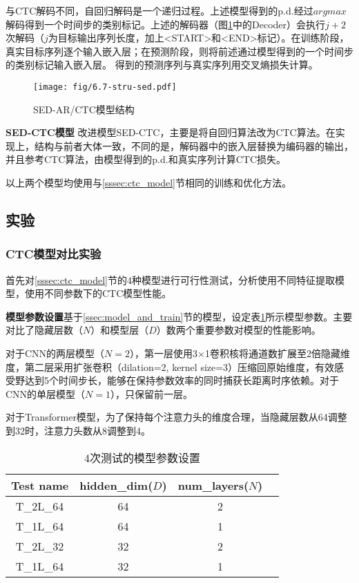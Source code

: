 与CTC解码不同，自回归解码是一个递归过程。上述模型得到的p.d.经过$argmax$解码得到一个时间步的类别标记。上述的解码器（图\ref{fig:6.7-stru-sed}中的Decoder）会执行$j+2$次解码（$j$为目标输出序列长度，加上<START>和<END>标记）。在训练阶段，真实目标序列逐个输入嵌入层；在预测阶段，则将前述通过模型得到的一个时间步的类别标记输入嵌入层。
得到的预测序列与真实序列用交叉熵损失计算。

\begin{figure}
    \centering
    \texttt{[image: fig/6.7-stru-sed.pdf]}
    \caption{SED-AR/CTC模型结构}
    \label{fig:6.7-stru-sed}
\end{figure}

\textbf{SED-CTC模型}\hspace{5pt} 改进模型SED-CTC，主要是将自回归算法改为CTC算法。在实现上，结构与前者大体一致，不同的是，解码器中的嵌入层替换为编码器的输出，并且参考CTC算法\cite{graves2006connectionist}，由模型得到的p.d.和真实序列计算CTC损失。

以上两个模型均使用与\ref{sssec:ctc_model}节相同的训练和优化方法。

\subsection{实验}

\subsubsection{CTC模型对比实验}

首先对\ref{sssec:ctc_model}节的4种模型进行可行性测试，分析使用不同特征提取模型，使用不同参数下的CTC模型性能。

\textbf{模型参数设置}\hspace{5pt}基于\ref{ssec:model_and_train}节的模型，设定表\ref{tab:model_para_setting}所示模型参数。主要对比了隐藏层数（$N$）和模型层（$D$）数两个重要参数对模型的性能影响。

对于CNN的两层模型（$N=2$），第一层使用3×1卷积核将通道数扩展至2倍隐藏维度，第二层采用扩张卷积（dilation=2, kernel size=3）压缩回原始维度，有效感受野达到5个时间步长，能够在保持参数效率的同时捕获长距离时序依赖。对于CNN的单层模型（$N=1$），只保留前一层。

对于Transformer模型，为了保持每个注意力头的维度合理，当隐藏层数从64调整到32时，注意力头数从8调整到4。

\begin{table}
    \centering
    \caption{4次测试的模型参数设置}
    \begin{tabular}{cccc}
    \hline
         \textbf{Test name}& \textbf{hidden\_dim($D$)} & \textbf{num\_layers($N$)}\\
         \hline
         T\_2L\_64 & 64 & 2  \\
         T\_1L\_64 & 64 & 1  \\
         T\_2L\_32 & 32 & 2  \\
         T\_1L\_64 & 32 & 1  \\
         \hline
    \end{tabular}
    \label{tab:model_para_setting}
\end{table}

